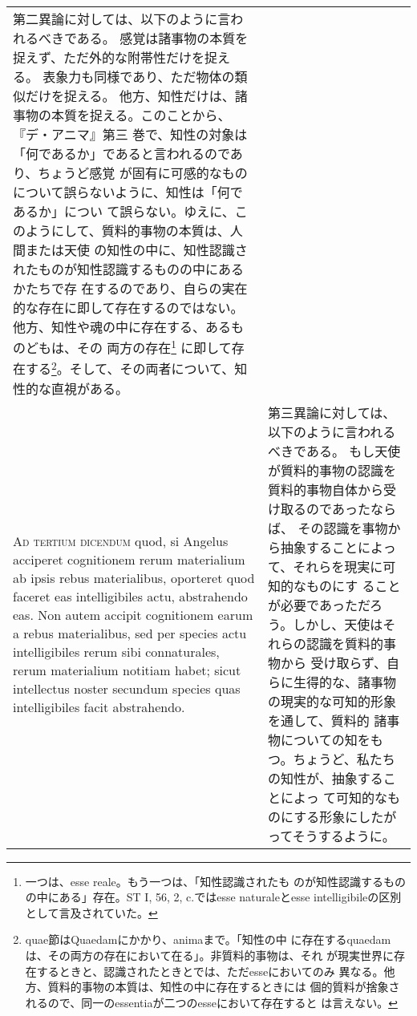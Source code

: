 \documentclass[10pt]{jsarticle} %
\begin{document}
\begin{longtable}{p{21em}p{21em}}
第二異論に対しては、以下のように言われるべきである。
感覚は諸事物の本質を捉えず、ただ外的な附帯性だけを捉える。
表象力も同様であり、ただ物体の類似だけを捉える。
他方、知性だけは、諸事物の本質を捉える。このことから、『デ・アニマ』第三
 巻で、知性の対象は「何であるか」であると言われるのであり、ちょうど感覚
 が固有に可感的なものについて誤らないように、知性は「何であるか」につい
 て誤らない。ゆえに、このようにして、質料的事物の本質は、人間または天使
 の知性の中に、知性認識されたものが知性認識するものの中にあるかたちで存
 在するのであり、自らの実在的な存在に即して存在するのではない。
他方、知性や魂の中に存在する、あるものどもは、その
 両方の存在\footnote{一つは、esse reale。もう一つは、「知性認識されたも
 のが知性認識するものの中にある」存在。ST I, 56, 2, c.ではesse naturaleとesse
 intelligibileの区別として言及されていた。}
に即して存在する\footnote{quae節はQuaedamにかかり、animaまで。「知性の中
 に存在するquaedamは、その両方の存在において在る」。非質料的事物は、それ
 が現実世界に存在するときと、認識されたときとでは、ただesseにおいてのみ
 異なる。他方、質料的事物の本質は、知性の中に存在するときには
 個的質料が捨象されるので、同一のessentiaが二つのesseにおいて存在すると
 は言えない。}。そして、その両者について、知性的な直視がある。


\\


{\scshape Ad tertium dicendum} quod, si Angelus
acciperet cognitionem rerum materialium ab ipsis rebus materialibus,
oporteret quod faceret eas intelligibiles actu, abstrahendo eas. Non
autem accipit cognitionem earum a rebus materialibus, sed per species
actu intelligibiles rerum sibi connaturales, rerum materialium notitiam
habet; sicut intellectus noster secundum species quas intelligibiles
facit abstrahendo.


&

第三異論に対しては、以下のように言われるべきである。
もし天使が質料的事物の認識を質料的事物自体から受け取るのであったならば、
 その認識を事物から抽象することによって、それらを現実に可知的なものにす
 ることが必要であっただろう。しかし、天使はそれらの認識を質料的事物から
 受け取らず、自らに生得的な、諸事物の現実的な可知的形象を通して、質料的
 諸事物についての知をもつ。ちょうど、私たちの知性が、抽象することによっ
 て可知的なものにする形象にしたがってそうするように。




\end{longtable}
\newpage
\end{document}
